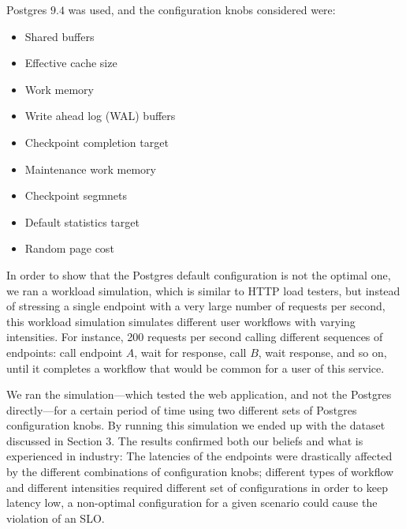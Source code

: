 Postgres $9.4$ was used, and the configuration knobs considered were:

\begin{itemize}
  \item Shared buffers
  \item Effective cache size
  \item Work memory
  \item Write ahead log (WAL) buffers
  \item Checkpoint completion target
  \item Maintenance work memory
  \item Checkpoint segmnets
  \item Default statistics target
  \item Random page cost
\end{itemize}

In order to show that the Postgres default configuration is not the optimal one, we ran a workload simulation, which is similar to HTTP load testers, but instead of stressing a single endpoint with a very large number of requests per second, this workload simulation simulates different user workflows with varying intensities. For instance, 200 requests per second calling different sequences of endpoints: call endpoint $A$, wait for response, call $B$, wait response, and so on, until it completes a workflow that would be common for a user of this service. 

We ran the simulation---which tested the web application, and not the Postgres directly---for a certain period of time using two different sets of Postgres configuration knobs. By running this simulation we ended up with the dataset discussed in Section 3. The results confirmed both our beliefs and what is experienced in industry: The latencies of the endpoints were drastically affected by the different combinations of configuration knobs; different types of workflow and different intensities required different set of configurations in order to keep latency low, a non-optimal configuration for a given scenario could cause the violation of an SLO.


